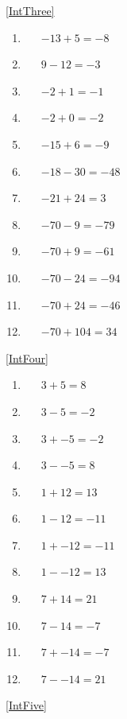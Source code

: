 \documentclass[a4paper,12pt]{article}
\begin{document}
\ref{IntThree}
	\begin{multicols}{3}
		\begin{enumerate}[label=\footnotesize \roman*)]
			\item~~~$-13+5=-8$
			\item~~~$9-12=-3$
			\item~~~$-2+1=-1$
			\item~~~$-2+0=-2$
			\item~~~$-15+6=-9$
			\item~~~$-18-30=-48$
			\item~~~$-21+24=3$
			\item~~~$-70-9=-79$
			\item~~~$-70+9=-61$
			\item~~~$-70-24=-94$
			\item~~~$-70+24=-46$
			\item~~~$-70+104=34$
		\end{enumerate}
	\end{multicols}
\ref{IntFour}
	\begin{multicols}{3}
		\begin{enumerate}[label=\footnotesize \roman*)]
			\item~~~$3+5=8$
			\item~~~$3-5=-2$
			\item~~~$3+-5=-2$
			\item~~~$3--5=8$
			\item~~~$1+12=13$
			\item~~~$1-12=-11$
			\item~~~$1+-12=-11$
			\item~~~$1--12=13$
			\item~~~$7+14=21$
			\item~~~$7-14=-7$
			\item~~~$7+-14=-7$
			\item~~~$7--14=21$
		\end{enumerate}
	\end{multicols}
\ref{IntFive}
\end{document}

